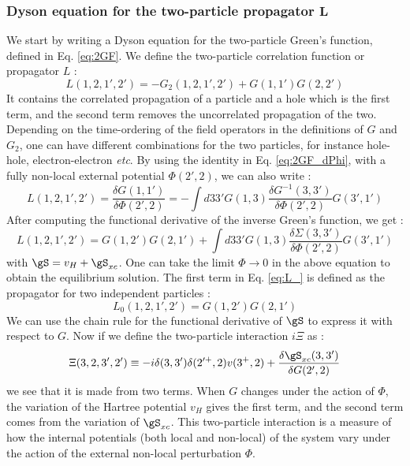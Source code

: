 \subsubsection{Dyson equation for the two-particle propagator $\mathbf{L}$}
We start by writing a Dyson equation for the two-particle Green's function, defined in Eq. \eqref{eq:2GF}.  We define the two-particle correlation function or propagator $L$ :
\begin{equation}
	L(1,2,1',2') = - G_2(1,2,1',2') + G(1,1')G(2,2') \label{eq:L}
\end{equation}
It contains the correlated propagation of a particle and a hole which is the first term, and the second term removes the uncorrelated propagation of the two. Depending on the time-ordering of the field operators in the definitions of $G$ and $G_2$, one can have different combinations for the two particles, for instance hole-hole, electron-electron \textit{etc}.
By using the identity in Eq. \eqref{eq:2GF_dPhi}, with a fully non-local external potential $\Phi(2',2)$, we can also write :
\begin{equation}
	L(1,2,1',2') = \frac{\delta G(1,1')}{\delta \Phi(2',2)} = -\int d33' G(1,3)\frac{\delta G^{-1}(3,3')}{\delta\Phi(2',2)}G(3',1')
\end{equation}
After computing the functional derivative of the inverse Green's function, we get :
\begin{equation}
	L(1,2,1',2') = G(1,2')G(2,1') + \int d33' G(1,3) \frac{\delta \Sigma(3,3')}{\delta \Phi(2',2)} G(3',1') \label{eq:L_}
\end{equation}
with $\gS = v_H + \gS_{xc}$. One can take the limit $\Phi \to 0$ in the above equation to obtain the equilibrium solution. The first term in Eq. \eqref{eq:L_} is defined as the propagator for two independent particles :
\begin{equation}
	L_0(1,2,1',2') = G(1,2') G(2,1') 
\end{equation}
We can use the chain rule for the functional derivative of $\gS$ to express it with respect to $G$. Now if we define the two-particle interaction $i\Xi$ as :
\begin{equation}
	\Xi(3,2,3',2') \equiv -i \delta(3,3')\delta(2'^+,2)v(3^+,2) + \frac{\delta \gS_{xc}(3,3')}{\delta G(2',2)}
\end{equation}
we see that it is made from two terms. When $G$ changes under the action of $\Phi$, the variation of the Hartree potential $v_H$ gives the first term, and the second term comes from the variation of $\gS_{xc}$. This two-particle interaction is a measure of how the internal potentials (both local and non-local) of the system vary under the action of the external non-local perturbation $\Phi$.
